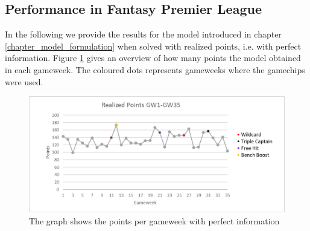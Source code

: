 \subsection{Performance in Fantasy Premier League}
In the following we provide the results for the model introduced in chapter \ref{chapter_model_formulation} when solved with realized points, i.e. with perfect information. Figure \ref{Figure_Realized_points} gives an overview of how many points the model obtained in each gameweek. The coloured dots represents gameweeks where the gamechips were used. 

\begin{figure}[H]
\label{fig:Realized_points}
    \centering
    \includegraphics[scale=0.75]{fig/chapter_7/RealizedPoints_colour.png}
    \caption{The graph shows the points per gameweek with perfect information}
\label{Figure_Realized_points}    
\end{figure}

